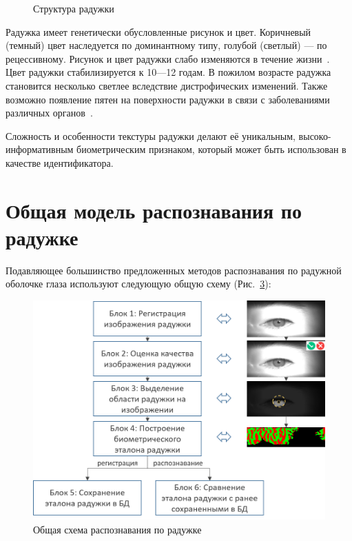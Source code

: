 \begin{figure}[!h]
\begin{subfigure}{.35\textwidth}
		\label{fig:blue_iris_bagel}
	\end{subfigure}%
	\caption{Структура радужки}
	\label{fig:iris_structure_and_example}
\end{figure}

Радужка имеет генетически обусловленные рисунок и цвет. Коричневый (темный) цвет наследуется по доминантному типу, голубой (светлый) — по рецессивному. Рисунок и цвет радужки слабо изменяются в течение жизни~\cite{arkhangelsky_1960}. Цвет радужки стабилизируется к 10—12 годам. В пожилом возрасте радужка становится несколько светлее вследствие дистрофических изменений. Также возможно появление пятен на поверхности радужки в связи с заболеваниями различных органов~\cite{krasnov_1952,arkhangelsky_1960}.

Сложность и особенности текстуры радужки делают её уникальным, высоко-информативным биометрическим признаком, который может быть использован в качестве идентификатора.


\section{Общая модель распознавания по радужке}
\label{sec:iris_recognition_basics}

Подавляющее большинство предложенных методов распознавания по радужной оболочке глаза используют следующую общую схему (Рис.~\ref{fig:irec_scheme_gen}):

\begin{figure}[!h]
	\centering
	\includegraphics[width=0.75\columnwidth]{pictures/irec-scheme-gen.png}
	\caption{Общая схема распознавания по радужке}
	\label{fig:irec_scheme_gen}
\end{figure}

